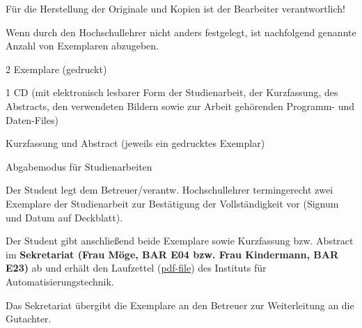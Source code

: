Für die Herstellung der Originale und Kopien ist der Bearbeiter verantwortlich!

Wenn durch den Hochschullehrer nicht anders festgelegt, ist nachfolgend genannte Anzahl von Exemplaren abzugeben.

\begin{compactitem}
  \item 2 Exemplare (gedruckt)
  \item 1 CD (mit elektronisch lesbarer Form der Studienarbeit, der Kurzfassung, des Abstracts, den verwendeten Bildern
        sowie zur Arbeit gehörenden Programm- und Daten-Files)
  \item Kurzfassung und Abstract (jeweils ein gedrucktes Exemplar)
  \item Abgabemodus für Studienarbeiten
    \begin{compactitem}
      \item Der Student legt dem Betreuer/verantw. Hochschullehrer termingerecht zwei Exemplare der Studienarbeit zur Bestätigung der Vollständigkeit vor (Signum und Datum auf Deckblatt).
      \item Der Student gibt anschließend beide Exemplare sowie Kurzfassung bzw. Abstract im {\bfseries Sekretariat (Frau Möge, BAR E04 bzw. Frau Kindermann, BAR E23)} ab und erhält den Laufzettel (\href{http://www.et.tu-dresden.de/ifa/fileadmin/user_upload/www_files/richtlinien_sa_da/DA-SA_Laufzettel.pdf}{pdf-file}) des Instituts für Automatisierungstechnik.
      \item Das Sekretariat übergibt die Exemplare an den Betreuer zur Weiterleitung an die Gutachter.
  \end{compactitem}
\end{compactitem}

